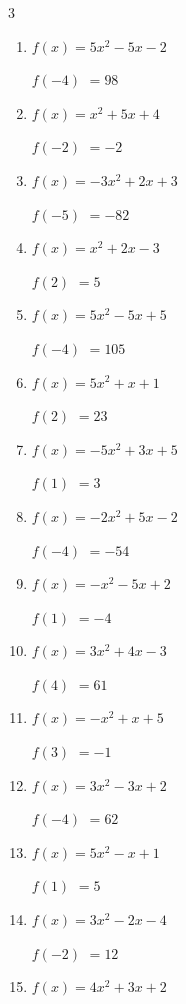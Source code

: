 \begin{multicols}{3}
\begin{enumerate}
$f(-4)$
        $= -94$

\columnbreak %

  \item $f(x)=5x^{2}-5x-2$

$f(-4)$
        $= 98$

  \item $f(x)=x^{2}+5x+4$

$f(-2)$
        $= -2$

  \item $f(x)=-3x^{2}+2x+3$

$f(-5)$
        $= -82$

  \item $f(x)=x^{2}+2x-3$

$f(2)$
        $= 5$

  \item $f(x)=5x^{2}-5x+5$

$f(-4)$
        $= 105$

  \item $f(x)=5x^{2}+x+1$

$f(2)$
        $= 23$

  \item $f(x)=-5x^{2}+3x+5$

$f(1)$
        $= 3$

  \item $f(x)=-2x^{2}+5x-2$

$f(-4)$
        $= -54$

  \item $f(x)=-x^{2}-5x+2$

$f(1)$
        $= -4$

  \item $f(x)=3x^{2}+4x-3$

$f(4)$
        $= 61$

  \item $f(x)=-x^{2}+x+5$

$f(3)$
        $= -1$

  \item $f(x)=3x^{2}-3x+2$

$f(-4)$
        $= 62$

  \item $f(x)=5x^{2}-x+1$

$f(1)$
        $= 5$

  \item $f(x)=3x^{2}-2x-4$

$f(-2)$
        $= 12$

  \item $f(x)=4x^{2}+3x+2$


\end{enumerate}
\end{multicols}
